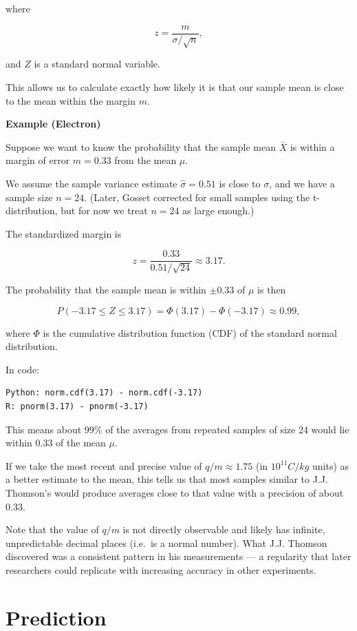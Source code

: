 \documentclass[
]{book}
\begin{document}
where

\[
z = \frac{m}{\sigma/\sqrt{n}},
\]

and \(Z\) is a standard normal variable.

This allows us to calculate exactly how likely it is that our sample mean is close to the mean within the margin \(m\).

\textbf{Example (Electron)}

Suppose we want to know the probability that the sample mean \(\bar{X}\) is within a margin of error \(m = 0.33\) from the mean \(\mu\).

We assume the sample variance estimate \(\hat{\sigma} = 0.51\) is close to \(\sigma\), and we have a sample size \(n = 24\). (Later, Gosset corrected for small samples using the t-distribution, but for now we treat \(n=24\) as large enough.)

The standardized margin is

\[
z = \frac{0.33}{0.51 / \sqrt{24}} \approx 3.17.
\]

The probability that the sample mean is within \(\pm 0.33\) of \(\mu\) is then

\[
P\left(-3.17 \leq Z \leq 3.17\right) = \Phi(3.17) - \Phi(-3.17) \approx 0.99,
\]

where \(\Phi\) is the cumulative distribution function (CDF) of the standard normal distribution.

In code:

\begin{verbatim}
Python: norm.cdf(3.17) - norm.cdf(-3.17)
R: pnorm(3.17) - pnorm(-3.17)
\end{verbatim}

This means about 99\% of the averages from repeated samples of size 24 would lie within 0.33 of the mean \(\mu\).

If we take the most recent and precise value of \(q/m \approx 1.75\) (in \(10^{11} C/kg\) units) as a better estimate to the mean, this tells us that most samples similar to J.J. Thomson's would produce averages close to that value with a precision of about \(0.33\).

Note that the value of \(q/m\) is not directly observable and likely has infinite, unpredictable decimal places (i.e.~is a normal number). What J.J. Thomson discovered was a consistent pattern in his measurements --- a regularity that later researchers could replicate with increasing accuracy in other experiments.

\hypertarget{prediction}{%
\section{Prediction}\label{prediction}}
\end{document}
